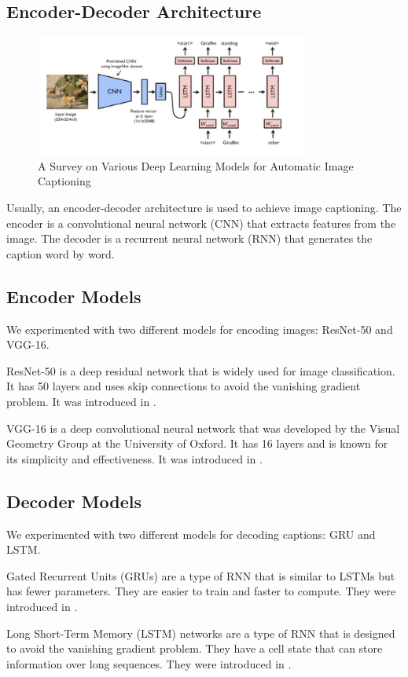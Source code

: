 \documentclass[12pt]{article}
\theoremstyle{plain}
\theoremstyle{definition}
\theoremstyle{remark}
\begin{document}
\subsection{Encoder-Decoder Architecture}
\begin{figure}[H]
    \centering
    \includegraphics[width=0.8\textwidth]{src/encoder-decoder.png}
    \caption{A Survey on Various Deep Learning Models for Automatic Image Captioning \cite{gaurav}}
    \label{fig:encoder-decoder}
\end{figure}
Usually, an encoder-decoder architecture is used to achieve image captioning. The encoder is a convolutional neural network (CNN) that extracts features from the image. The decoder is a recurrent neural network (RNN) that generates the caption word by word.

\subsection{Encoder Models}
We experimented with two different models for encoding images: ResNet-50 and VGG-16.
\par ResNet-50 is a deep residual network that is widely used for image classification. It has 50 layers and uses skip connections to avoid the vanishing gradient problem. It was introduced in \cite{he}.
\par VGG-16 is a deep convolutional neural network that was developed by the Visual Geometry Group at the University of Oxford. It has 16 layers and is known for its simplicity and effectiveness. It was introduced in \cite{simonyan}.

\subsection{Decoder Models}
We experimented with two different models for decoding captions: GRU and LSTM.
\par Gated Recurrent Units (GRUs) are a type of RNN that is similar to LSTMs but has fewer parameters. They are easier to train and faster to compute. They were introduced in \cite{cho}.
\par Long Short-Term Memory (LSTM) networks are a type of RNN that is designed to avoid the vanishing gradient problem. They have a cell state that can store information over long sequences. They were introduced in \cite{hochreiter}.
\end{document}
